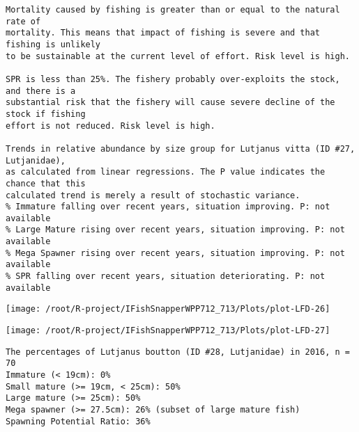 \documentclass{report}\usepackage[]{graphicx}\usepackage[]{color}
\makeatletter
\def\maxwidth{ %
  \ifdim\Gin@nat@width>\linewidth
    \linewidth
  \else
    \Gin@nat@width
  \fi
}
\newenvironment{kframe}{%
 \def\at@end@of@kframe{}%
 \ifinner\ifhmode%
  \def\at@end@of@kframe{\end{minipage}}%
  \begin{minipage}{\columnwidth}%
 \fi\fi%
 \def\FrameCommand##1{\hskip\@totalleftmargin \hskip-\fboxsep
 \colorbox{shadecolor}{##1}\hskip-\fboxsep
     \hskip-\linewidth \hskip-\@totalleftmargin \hskip\columnwidth}%
 \MakeFramed {\advance\hsize-\width
   \@totalleftmargin\z@ \linewidth\hsize
   \@setminipage}}%
 {\par\unskip\endMakeFramed%
 \at@end@of@kframe}
\newenvironment{knitrout}{}{} %
\makeatother
\begin{document}
\begin{knitrout}
\begin{kframe}
\begin{verbatim}
Mortality caused by fishing is greater than or equal to the natural rate of
mortality. This means that impact of fishing is severe and that fishing is unlikely
to be sustainable at the current level of effort. Risk level is high.
 
SPR is less than 25%. The fishery probably over-exploits the stock, and there is a
substantial risk that the fishery will cause severe decline of the stock if fishing
effort is not reduced. Risk level is high.
 
Trends in relative abundance by size group for Lutjanus vitta (ID #27, Lutjanidae),
as calculated from linear regressions. The P value indicates the chance that this
calculated trend is merely a result of stochastic variance.
% Immature falling over recent years, situation improving. P: not available
% Large Mature rising over recent years, situation improving. P: not available
% Mega Spawner rising over recent years, situation improving. P: not available
% SPR falling over recent years, situation deteriorating. P: not available
\end{verbatim}
\end{kframe}
\texttt{[image: /root/R-project/IFishSnapperWPP712\_713/Plots/plot-LFD-26]} 
\begin{kframe}

{\ttfamily\noindent\color{warningcolor}{Warning in predict.lm(lm\_perc\_imm, newdata = data.frame(x = X)): prediction from a rank-deficient fit may be misleading}}

{\ttfamily\noindent\color{warningcolor}{Warning in predict.lm(lm\_perc\_lmat, newdata = data.frame(x = X)): prediction from a rank-deficient fit may be misleading}}

{\ttfamily\noindent\color{warningcolor}{Warning in predict.lm(lm\_perc\_megasp, newdata = data.frame(x = X)): prediction from a rank-deficient fit may be misleading}}

{\ttfamily\noindent\color{warningcolor}{Warning in predict.lm(lm\_perc\_spr, newdata = data.frame(x = X)): prediction from a rank-deficient fit may be misleading}}\end{kframe}
\texttt{[image: /root/R-project/IFishSnapperWPP712\_713/Plots/plot-LFD-27]} 
\begin{kframe}\begin{verbatim}
The percentages of Lutjanus boutton (ID #28, Lutjanidae) in 2016, n = 70
Immature (< 19cm): 0%
Small mature (>= 19cm, < 25cm): 50%
Large mature (>= 25cm): 50%
Mega spawner (>= 27.5cm): 26% (subset of large mature fish)
Spawning Potential Ratio: 36%
 

\end{verbatim}
\end{kframe}
\end{knitrout}
\end{document}
